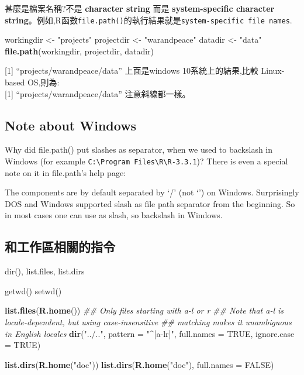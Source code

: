 \documentclass[]{book}
\newenvironment{Shaded}{\begin{snugshade}}{\end{snugshade}}
\newcommand{\CommentTok}[1]{\textcolor[rgb]{0.56,0.35,0.01}{\textit{#1}}}
\newcommand{\DataTypeTok}[1]{\textcolor[rgb]{0.13,0.29,0.53}{#1}}
\newcommand{\KeywordTok}[1]{\textcolor[rgb]{0.13,0.29,0.53}{\textbf{#1}}}
\newcommand{\NormalTok}[1]{#1}
\newcommand{\OtherTok}[1]{\textcolor[rgb]{0.56,0.35,0.01}{#1}}
\newcommand{\StringTok}[1]{\textcolor[rgb]{0.31,0.60,0.02}{#1}}
\theoremstyle{definition}
\theoremstyle{definition}
\theoremstyle{definition}
\theoremstyle{remark}
\begin{document}
甚麼是檔案名稱?不是 \textbf{character string} 而是
\textbf{system-specific character
string}。例如,R函數\texttt{file.path()}的執行結果就是\texttt{system-specific\ file\ names}.

\begin{Shaded}
\begin{Highlighting}[]
\NormalTok{workingdir <-}\StringTok{ "projects"}
\NormalTok{projectdir <-}\StringTok{ "warandpeace"}
\NormalTok{datadir    <-}\StringTok{ "data"}
\KeywordTok{file.path}\NormalTok{(workingdir, projectdir, datadir)}
\end{Highlighting}
\end{Shaded}

{[}1{]} ``projects/warandpeace/data'' 上面是windows 10系統上的結果,比較
Linux-based OS,則為:\\
{[}1{]} ``projects/warandpeace/data'' 注意斜線都一樣。

\hypertarget{note-about-windows}{%
\subsection{Note about Windows}\label{note-about-windows}}

Why did file.path() put slashes as separator, when we used to backslash
in Windows (for example
\texttt{C:\textbackslash{}Program\ Files\textbackslash{}R\textbackslash{}R-3.3.1})?
There is even a special note on it in file.path's help page:

The components are by default separated by `/' (not `') on Windows.
Surprisingly DOS and Windows supported slash as file path separator from
the beginning. So in most cases one can use as slash, so backslash in
Windows.

\subsection{和工作區相關的指令}

dir(), list.files, list.dirs

getwd() setwd()

\begin{Shaded}
\begin{Highlighting}[]
\KeywordTok{list.files}\NormalTok{(}\KeywordTok{R.home}\NormalTok{())}
\CommentTok{## Only files starting with a-l or r}
\CommentTok{## Note that a-l is locale-dependent, but using case-insensitive}
\CommentTok{## matching makes it unambiguous in English locales}
\KeywordTok{dir}\NormalTok{(}\StringTok{"../.."}\NormalTok{, }\DataTypeTok{pattern =} \StringTok{"^[a-lr]"}\NormalTok{, }\DataTypeTok{full.names =} \OtherTok{TRUE}\NormalTok{, }\DataTypeTok{ignore.case =} \OtherTok{TRUE}\NormalTok{)}

\KeywordTok{list.dirs}\NormalTok{(}\KeywordTok{R.home}\NormalTok{(}\StringTok{"doc"}\NormalTok{))}
\KeywordTok{list.dirs}\NormalTok{(}\KeywordTok{R.home}\NormalTok{(}\StringTok{"doc"}\NormalTok{), }\DataTypeTok{full.names =} \OtherTok{FALSE}\NormalTok{)}
\end{Highlighting}
\end{Shaded}
\end{document}
